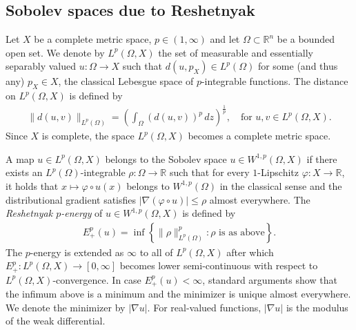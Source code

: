 \documentclass[a4paper,leqno]{amsart}
\numberwithin{equation}{section}
\theoremstyle{remark}
\theoremstyle{remark}
\newcommand{\R}{\mathbb{R}}
\begin{document}
\subsection{Sobolev spaces due to Reshetnyak}
Let $X$ be a complete metric space, $p \in (1,\infty)$ and let $\Omega \subset \mathbb{R}^n$ be a bounded open set. We denote by $L^{p}( \Omega, X )$ the set of measurable and essentially separably valued $u \colon \Omega \to X$ such that $d(u,p_X) \in L^{p}( \Omega )$ for some (and thus any) $p_X \in X$, the classical Lebesgue space of $p$-integrable functions. The distance on $L^p( \Omega, X )$ is defined by
\begin{align*}
    \| d(u,v) \|_{L^{p}(\Omega)} = \left( \int_{\Omega} ( d(u,v) )^p \,dz \right)^{ \frac{1}{p} },
    \quad\text{for $u,v \in L^{p}( \Omega, X )$.}
\end{align*}
Since $X$ is complete, the space $L^p( \Omega, X )$ becomes a complete metric space.

A map $u \in L^{p}( \Omega, X )$ belongs to the Sobolev space $u \in W^{1,p}( \Omega, X )$ if there exists an $L^{p}( \Omega )$-integrable $\rho \colon \Omega \rightarrow \R$ such that for every $1$-Lipschitz $\varphi \colon X \rightarrow \mathbb{R}$, it holds that $x \mapsto \varphi \circ u(x)$ belongs to $W^{1,p}( \Omega )$ in the classical sense and the distributional gradient satisfies $|\nabla( \varphi \circ u ) | \leq \rho$ almost everywhere. The \emph{Reshetnyak $p$-energy} of $u \in W^{1,p}( \Omega, X )$ is defined by
\begin{align*}
    E_{+}^{p}( u ) = \inf\left\{ \| \rho \|_{ L^{p}(\Omega) }^p \colon \rho \text{ is as above} \right\}.
\end{align*}
The $p$-energy is extended as $\infty$ to all of $L^{p}( \Omega, X )$ after which $E_{+}^{p} \colon L^{p}( \Omega, X ) \rightarrow [0,\infty]$ becomes lower semi-continuous with respect to $L^{p}( \Omega, X )$-convergence. In case $E_+^{p}(u) < \infty$, standard arguments show that the infimum above is a minimum and the minimizer is unique almost everywhere. We denote the minimizer by $|\nabla u|$. For real-valued functions, $|\nabla u|$ is the modulus of the weak differential.
\end{document}
